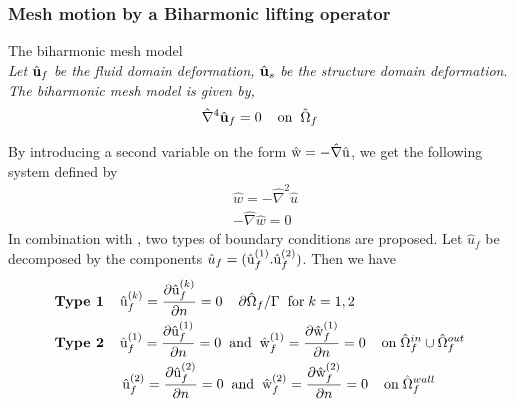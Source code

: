 \subsubsection*{Mesh motion by a Biharmonic lifting operator}
\begin{equat}
The biharmonic mesh model \\ \textit{Let} $\hat{\mathbf{u}}_f$ \textit{be the fluid domain deformation,} $\hat{\mathbf{u}}_s$ \textit{be the structure domain deformation}. \textit{The biharmonic mesh model is given by, }  
\begin{align*}
\hat{\nabla}^4 \hat{\mathbf{u}}_f = 0 \hspace{4mm} \text{on} \hspace{2mm} \hat{\Omega}_f 
\end{align*}
\end{equat}
By introducing a second variable on the form $\text{\^{w}} = - \hat{\nabla} \text{\^{u}}$, we get the following system defined by 
\begin{align*}
&\hat{w} = -\hat{\nabla}^2\hat{u} \\
&- \hat{\nabla} \hat{w} = 0
\end{align*}
In combination with \cite{Wicka}, two types of boundary conditions are proposed. Let 
$\hat{u}_f$ be decomposed by the components $\hat{u}_f = (\text{\^{u}}_f^{(1)}. \text{\^{u}}_f^{(2)})$. Then we have
\begin{align*}
&\textbf{Type 1} \hspace{4mm} \ha{u}_f^{(k)} = \pder{\ha{u}_f^{(k)}}{n} = 0 \hspace{4mm} \partial \hat{\Omega}_f / \Gamma \hspace{2mm} \text{for} \hspace{1mm} k = 1, 2 \\
&\textbf{Type 2} \hspace{4mm} \ha{u}_f^{(1)} = \pder{\ha{u}_f^{(1)}}{n} = 0 
\hspace{2mm} \text{and} \hspace{2mm} \ha{w}_f^{(1)} = \pder{\ha{w}_f^{(1)}}{n} = 0 \hspace{4mm} \text{on} \hspace{1mm} \hat{\Omega}_f^{in} \cup \hat{\Omega}_f^{out} \\ 
&\hspace{17mm}  \ha{u}_f^{(2)} = \pder{\ha{u}_f^{(2)}}{n} = 0 
\hspace{2mm} \text{and} \hspace{2mm} \ha{w}_f^{(2)} = \pder{\ha{w}_f^{(2)}}{n} = 0 \hspace{4mm} \text{on} \hspace{1mm}  \hat{\Omega}_f^{wall}
\end{align*}
